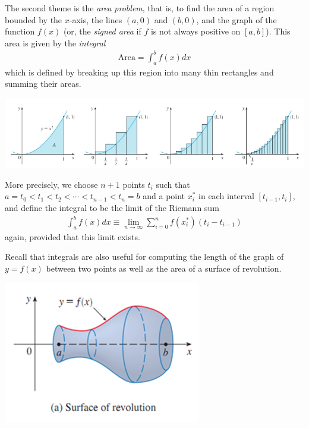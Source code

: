\documentclass[12pt,letterpaper,reqno]{article}
\numberwithin{equation}{section}
\newcommand{\ti}[1]{\textit{#1}}
\begin{document}
The second theme is the \ti{area problem}, that is, to find the area of a region bounded by the $x$-axis, the lines $(a,0)$ and $(b,0)$, and the graph of the function $f(x)$ (or, the \ti{signed area} if $f$ is not always positive on $[a,b]$). This area is given by the \ti{integral}
\begin{align*}
	\text{Area}=\int_a^b f(x)dx
\end{align*}
which is defined by breaking up this region into many thin rectangles and summing their areas. 
\begin{center}
	\includegraphics[scale=0.5]{figures_mvc/riemann_sum_example}
\end{center}
More precisely, we choose $n+1$ points $t_i$ such that $a=t_0<t_1<t_2<\cdots <t_{n-1}<t_n=b$ and a point $x_i^*$ in each interval $[t_{i-1},t_i]$, and define the integral to be the limit of the Riemann sum
\begin{align*}
	\int_a^b f(x)dx\equiv \lim_{n\to \infty} \sum_{i=0}^nf(x_i^*)(t_i-t_{i-1})
\end{align*}
again, provided that this limit exists. 

Recall that integrals are also useful for computing the length of the graph of $y=f(x)$ between two points as well as the area of a surface of revolution.

\begin{center}
	\includegraphics[scale=0.5]{figures_mvc/surface_of_revolution}
\end{center}
\end{document}
